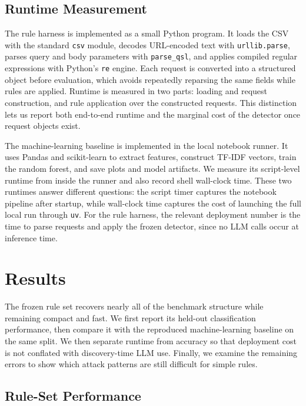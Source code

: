 \documentclass[letterpaper,twocolumn,10pt]{article}
\begin{document}
\subsection{Runtime Measurement}

The rule harness is implemented as a small Python program. It loads the CSV with the standard \texttt{csv} module, decodes URL-encoded text with \texttt{urllib.parse}, parses query and body parameters with \texttt{parse\_qsl}, and applies compiled regular expressions with Python's \texttt{re} engine. Each request is converted into a structured object before evaluation, which avoids repeatedly reparsing the same fields while rules are applied. Runtime is measured in two parts: loading and request construction, and rule application over the constructed requests. This distinction lets us report both end-to-end runtime and the marginal cost of the detector once request objects exist.

The machine-learning baseline is implemented in the local notebook runner. It uses Pandas and scikit-learn to extract features, construct TF-IDF vectors, train the random forest, and save plots and model artifacts. We measure its script-level runtime from inside the runner and also record shell wall-clock time. These two runtimes answer different questions: the script timer captures the notebook pipeline after startup, while wall-clock time captures the cost of launching the full local run through \texttt{uv}. For the rule harness, the relevant deployment number is the time to parse requests and apply the frozen detector, since no LLM calls occur at inference time.

\section{Results}

The frozen rule set recovers nearly all of the benchmark structure while remaining compact and fast. We first report its held-out classification performance, then compare it with the reproduced machine-learning baseline on the same split. We then separate runtime from accuracy so that deployment cost is not conflated with discovery-time LLM use. Finally, we examine the remaining errors to show which attack patterns are still difficult for simple rules.

\subsection{Rule-Set Performance}
\end{document}
